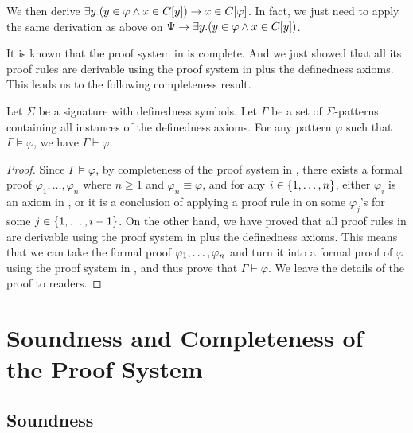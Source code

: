 \documentclass{amsart}
\begin{document}
We then derive
$ \exists y . ( y \in \varphi \wedge x \in C[y] )
\to x \in C[\varphi]$.
In fact, we just need to apply the same derivation as above on
$\Psi \to \exists y . ( y \in \varphi \wedge x \in C[y] )$.







It is known that the proof system in  is 
complete.
And we just showed that all its proof rules are derivable using the proof 
system in  plus the definedness axioms.
This leads us to the following completeness result.

\begin{proposition}
Let $\Sigma$ be a signature with definedness symbols. Let $\Gamma$ be a set of 
$\Sigma$-patterns containing all instances of the definedness axioms.
For any pattern $\varphi$ such that $\Gamma \vDash \varphi$, 
we have $\Gamma \vdash \varphi$.
\end{proposition}
\begin{proof}
Since $\Gamma \vDash \varphi$, by completeness of the proof system in 
, there exists a formal proof
$\varphi_1, \dots, \varphi_n$
where $n \ge 1$ and $\varphi_n \equiv \varphi$, and 
for any $i \in \{1 ,\dots, n\}$, either $\varphi_i$ is an axiom in 
, or it is a conclusion of applying a 
proof rule in 
 on some $\varphi_j$'s for some 
$j \in \{1 ,\dots, i-1\}$.
On the other hand, we have proved that all proof rules in 
 are derivable using the proof system in
 plus the definedness axioms.
This means that we can take the formal proof $\varphi_1 ,\dots, \varphi_n$ and 
turn it into a formal proof of $\varphi$ using the proof system in
, and thus prove that $\Gamma \vdash \varphi$.
We leave the details of the proof to readers.
\end{proof}


\section{Soundness and Completeness of the Proof System}
\label{sec_soundness_and_completeness}

\subsection{Soundness}
\label{sec_soundness}
\end{document}
